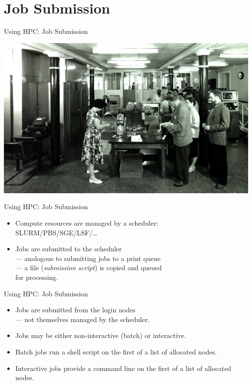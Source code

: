 \section{Job Submission}
\begin{frame}{Using HPC: Job Submission}
\centerline{\includegraphics[width=1\textwidth]{imgs/EDSAC_2_1960.jpg}}
\end{frame}
\begin{frame}{Using HPC: Job Submission}
\begin{itemize}
\item{Compute resources are managed by a scheduler:\hfill\\\qquad\alert{SLURM}/PBS/SGE/LSF/\ldots}
\item{Jobs are submitted to the scheduler\hfill\\\qquad --- analogous to submitting jobs to a print queue\hfill\\\qquad --- a file (\emph{submission script}) is copied and queued\hfill\\\qquad \hphantom{---} for processing.}
\end{itemize}
\end{frame}

\begin{frame}{Using HPC: Job Submission}
\begin{itemize}
\item{Jobs are submitted from the \alert{login nodes}\hfill\\\qquad  --- not themselves managed by the scheduler.}
\item{Jobs may be either non-interactive (\alert{batch}) or \alert{interactive}.}
\pause
\item{\alert{Batch} jobs run a shell script on the first of a list of allocated nodes.}
\item{\alert{Interactive} jobs provide a command line on the first of a list of allocated nodes.}
\end{itemize}
\end{frame}

